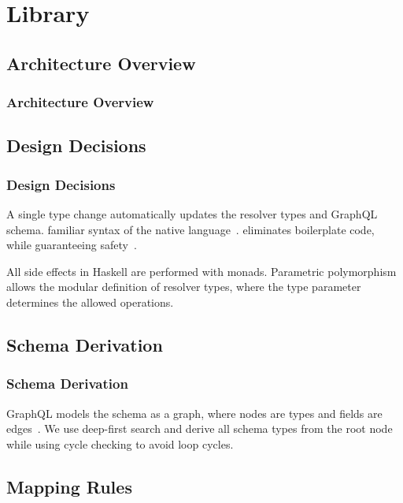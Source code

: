 \section{Library}


\subsection{Architecture Overview}

\begin{frame}\frametitle{Architecture Overview}


\end{frame}

\subsection{Design Decisions} 
\begin{frame}\frametitle{Design Decisions}

\begin{itemize}
     A single type change automatically updates the resolver types and GraphQL schema. 
      familiar syntax of the native language~\cite{edsl-modeling}.
     eliminates boilerplate code, while guaranteeing safety~\cite{datatype-generic-programming, scrap-your-boilerplate}.
    
     All side effects in Haskell are performed with monads.
     Parametric polymorphism allows the modular definition of resolver types, where the type parameter determines the allowed operations.
\end{itemize}
\end{frame}

\subsection{Schema Derivation} 
\begin{frame}\frametitle{Schema Derivation}

GraphQL models the schema as a graph, where nodes are types and fields are edges~\cite{migrating-to-gql}. We use deep-first search and derive all schema types from the root node while using cycle checking to avoid loop cycles.

\end{frame}

\subsection{Mapping Rules}

